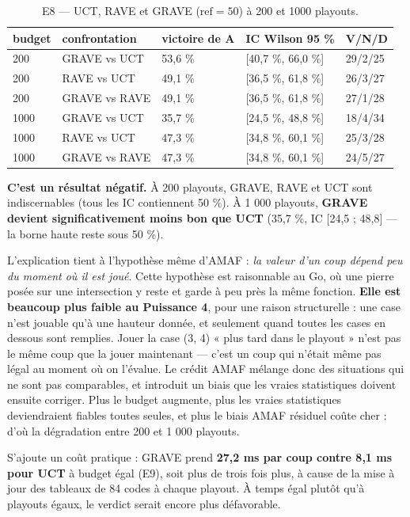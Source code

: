 \documentclass[11pt,a4paper]{article}
\begin{document}
\begin{table}[htbp]
\centering\small
\caption{E8 --- UCT, RAVE et GRAVE ($\mathrm{ref} = 50$) à 200 et 1000 playouts.}
\label{tab:e8}
\begin{tabular}{@{}lllll@{}}
\toprule
budget & confrontation & victoire de A & IC Wilson 95 \% & V/N/D \\
\midrule
200 & GRAVE vs UCT & 53,6 \% & {[}40,7 \%, 66,0 \%{]} & 29/2/25 \\
200 & RAVE vs UCT & 49,1 \% & {[}36,5 \%, 61,8 \%{]} & 26/3/27 \\
200 & GRAVE vs RAVE & 49,1 \% & {[}36,5 \%, 61,8 \%{]} & 27/1/28 \\
1000 & GRAVE vs UCT & 35,7 \% & {[}24,5 \%, 48,8 \%{]} & 18/4/34 \\
1000 & RAVE vs UCT & 47,3 \% & {[}34,8 \%, 60,1 \%{]} & 25/3/28 \\
1000 & GRAVE vs RAVE & 47,3 \% & {[}34,8 \%, 60,1 \%{]} & 24/5/27 \\
\bottomrule
\end{tabular}
\end{table}

\textbf{C'est un résultat négatif.} À 200 playouts, GRAVE, RAVE et UCT sont indiscernables (tous les IC contiennent
50 \%). À 1 000 playouts, \textbf{GRAVE devient significativement moins bon que UCT}
(35,7 \%, IC {[}24,5 ; 48,8{]} --- la borne haute reste sous 50 \%).

L'explication tient à l'hypothèse même d'AMAF : \emph{la valeur d'un coup dépend peu du
moment où il est joué}. Cette hypothèse est raisonnable au Go, où une pierre
posée sur une intersection y reste et garde à peu près la même fonction. \textbf{Elle
est beaucoup plus faible au Puissance 4}, pour une raison structurelle : une case
n'est jouable qu'à une hauteur donnée, et seulement quand toutes les cases en
dessous sont remplies. Jouer la case (3, 4) « plus tard dans le playout » n'est
pas le même coup que la jouer maintenant --- c'est un coup qui n'était même pas
légal au moment où on l'évalue. Le crédit AMAF mélange donc des situations qui ne
sont pas comparables, et introduit un biais que les vraies statistiques doivent
ensuite corriger. Plus le budget augmente, plus les vraies statistiques
deviendraient fiables toutes seules, et plus le biais AMAF résiduel coûte cher :
d'où la dégradation entre 200 et 1 000 playouts.

S'ajoute un coût pratique : GRAVE prend \textbf{27,2 ms par coup contre 8,1 ms pour
UCT} à budget égal (E9), soit plus de trois fois plus, à cause de la mise à jour
des tableaux de 84 codes à chaque playout. À temps égal plutôt qu'à playouts égaux,
le verdict serait encore plus défavorable.
\end{document}

